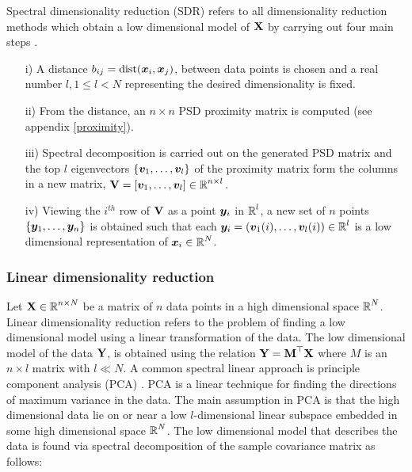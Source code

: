 Spectral dimensionality reduction (SDR) refers to all dimensionality reduction methods which obtain a low dimensional model of $\textbf{X}$ by carrying out four main steps \cite{Lawrence2010}.
\begin{itemize}
\item[i)] A distance $b_{ij} = \text{dist}(\boldsymbol{x}_{i}, \boldsymbol{x}_{j})$, between data points
is chosen and a real number $l, 1 \leq l < N$ representing the desired dimensionality is fixed.
\item[ii)] From the distance, an $n \times n$ PSD proximity matrix  is computed (see appendix \ref{proximity}).
\item[iii)] Spectral decomposition is carried out on the generated PSD matrix and
the top $l$ eigenvectors $\{ \boldsymbol{v}_{1}, \ldots, \boldsymbol{v}_{l} \}$ of the proximity matrix
form the columns in a new matrix, $\textbf{V} = [\boldsymbol{v}_{1}, \ldots, \boldsymbol{v}_{l}] \in \operatorname{\mathbb{R}}^{n \times l}.$
\item[iv)] Viewing the $i^{th}$ row of $\textbf{V}$ as a point $\boldsymbol{y}_{i}$
in $\operatorname{\mathbb{R}}^{l}$, a new set of $n$ points 
$\{\boldsymbol{y}_{1}, \ldots, \boldsymbol{y}_{n} \}$ is obtained such that each
 $\boldsymbol{y}_{i} = (\boldsymbol{v}_{1}(i), \ldots, \boldsymbol{v}_{l}(i)) \in \operatorname{\mathbb{R}}^{l}$
is a low dimensional representation of $\boldsymbol{x}_{i} \in \operatorname{\mathbb{R}}^{N}$.
\end{itemize}


\subsubsection{Linear dimensionality reduction}
Let $\textbf{X} \in \operatorname{\mathbb{R}}^{n \times N}$ be a matrix of $n$ data points in a high dimensional space $\operatorname{\mathbb{R}}^{N}$. Linear dimensionality reduction refers to the problem of finding a low dimensional model using a linear transformation of the data. The low dimensional model of the data $\textbf{Y}$, is obtained using the relation $\textbf{Y} = \textbf{M}^{\top}\textbf{X}$ where $M$ is an $n \times l$ matrix with $l \ll N$. A common spectral linear approach is principle component analysis (PCA) \cite{JolliffeIT1986PCAa}. PCA is a linear technique for finding the directions of maximum variance in the data. The main assumption in PCA is that the high dimensional data lie on or near a low $l$-dimensional linear subspace embedded in some high dimensional space $\operatorname{\mathbb{R}}^{N}$. 
The low dimensional model that describes the data is found via spectral decomposition of the sample covariance matrix as follows:

